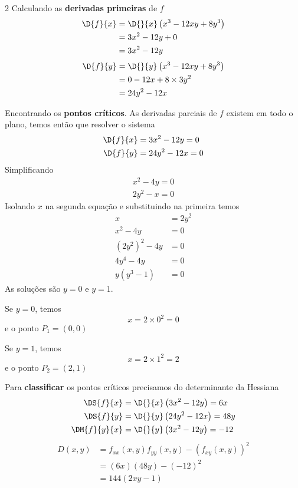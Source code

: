 \documentclass[a4paper,12pt,fleqn]{article}
\begin{document}
\begin{answer}
\setlength\columnsep{3em}
\begin{multicols*}{2}
\raggedcolumns
  Calculando as \textbf{derivadas primeiras} de $f$
  \begin{align*}
    \D{f}{x}
    & = \D{}{x}\left(x^3 - 12xy + 8y^3\right) \\
    & = 3x^2 - 12y + 0 \\
    & = 3x^2 - 12y
  \end{align*}
  \begin{align*}
    \D{f}{y}
    & = \D{}{y}\left(x^3 - 12xy + 8y^3\right) \\
    & = 0 - 12x +8\times 3 y^2 \\
    & = 24y^2 - 12x
  \end{align*}

  Encontrando os \textbf{pontos críticos}.
  As derivadas parciais de $f$ existem em todo o plano, temos então que resolver o sistema
  \begin{align*}
    \D{f}{x} & =  3x^2 - 12y = 0 \\
    \D{f}{y} & = 24y^2 - 12x = 0
  \end{align*}
  Simplificando
  \begin{align*}
     x^2 - 4y = 0 \\
    2y^2 -  x = 0
  \end{align*}
  Isolando $x$ na segunda equação e substituindo na primeira temos
  \begin{align*}
    x                        & = 2y^2 \\
    x^2 - 4y                 & = 0    \\
    \left(2y^2\right)^2 - 4y & = 0    \\
    4y^4 - 4y                & = 0    \\
    y\left(y^3 - 1\right)    & = 0
  \end{align*}
  As soluções são $y=0$ e $y=1$.

  Se $y=0$, temos
  \[
    x = 2\times 0^2 = 0
  \]
  e o ponto $P_1 = (0, 0)$

  Se $y=1$, temos
  \[
    x = 2\times 1^2 = 2
  \]
  e o ponto $P_2 = (2, 1)$

  Para \textbf{classificar} os pontos críticos precisamos
  do determinante da Hessiana
  \begin{align*}
    \DS{f}{x}    & = \D{}{x}\left( 3x^2 - 12y\right) =  6x \\
    \DS{f}{y}    & = \D{}{y}\left(24y^2 - 12x\right) = 48y \\
    \DM{f}{y}{x} & = \D{}{y}\left( 3x^2 - 12y\right) = -12
  \end{align*}
  \begin{align*}
    D(x, y)
    & = f_{xx}(x, y) f_{yy}(x, y) - \left(f_{xy}(x, y)\right)^2 \\
    & = (6x)(48y) - (-12)^2 \\
    & = 144(2xy - 1)
  \end{align*}


\end{multicols*}
\end{answer}
\end{document}
